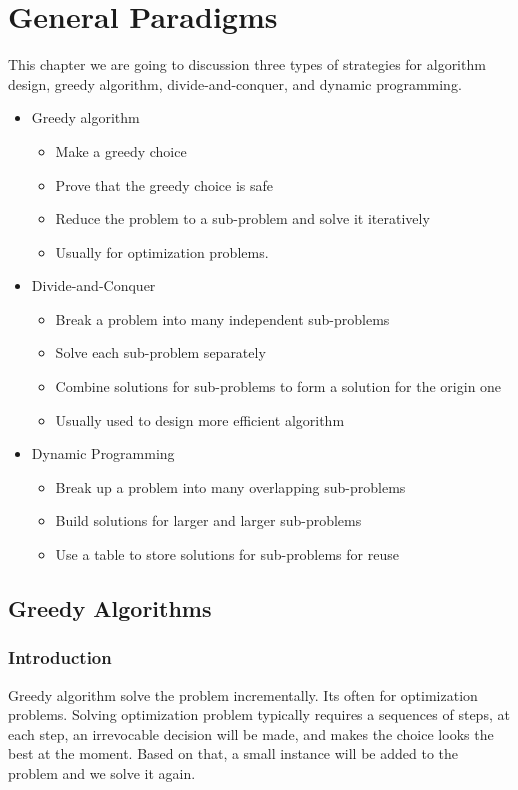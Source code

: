		\chapter{General Paradigms}
			This chapter we are going to discussion three types of strategies for algorithm design, greedy algorithm, divide-and-conquer, and dynamic programming.
			\begin{itemize}
				\item Greedy algorithm
				\begin{itemize}
					\item Make a greedy choice
					\item Prove that the greedy choice is safe
					\item Reduce the problem to a sub-problem and solve it iteratively
					\item Usually for optimization problems.
				\end{itemize}
				\item Divide-and-Conquer
				\begin{itemize}
					\item Break a problem into many independent sub-problems
					\item Solve each sub-problem separately
					\item Combine solutions for sub-problems to form a solution for the origin one
					\item Usually used to design more efficient algorithm
				\end{itemize}
				\item Dynamic Programming
				\begin{itemize}
					\item Break up a problem into many overlapping sub-problems
					\item Build solutions for larger and larger sub-problems
					\item Use a table to store solutions for sub-problems for reuse
				\end{itemize}
			\end{itemize}

			\section{Greedy Algorithms}
				\subsection{Introduction}
					Greedy algorithm solve the problem incrementally. Its often for optimization problems. Solving optimization problem typically requires a sequences of steps, at each step, an irrevocable decision will be made, and makes the choice looks the best at the moment. Based on that, a small instance will be added to the problem and we solve it again.


